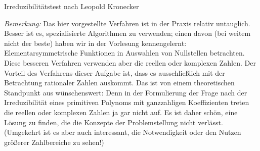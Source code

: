 \documentclass{algblatt}
\begin{document}
\begin{aufgabe}{Irreduzibilitätstest nach Leopold Kronecker}
\begin{loesungE}
\emph{Bemerkung:} Das hier vorgestellte Verfahren ist in der Praxis relativ
untauglich. Besser ist es, spezialisierte Algorithmen zu verwenden; einen davon
(bei weitem nicht der beste) haben wir in der Vorlesung kennengelernt:
Elementarsymmetrische Funktionen in Auswahlen von Nullstellen betrachten.
Diese besseren Verfahren verwenden
aber die reellen oder komplexen Zahlen. Der Vorteil des Verfahrens dieser
Aufgabe ist, dass es ausschließlich mit der Betrachtung rationaler Zahlen
auskommt. Das ist von einem theoretischen Standpunkt aus wünschenswert: Denn in
der Formulierung der Frage nach der Irreduzibilität eines primitiven Polynoms
mit ganzzahligen Koeffizienten treten die reellen oder komplexen Zahlen ja gar
nicht auf. Es ist daher schön, eine Lösung zu finden, die die Konzepte der
Problemstellung nicht verlässt. (Umgekehrt ist es aber auch interessant, die
Notwendigkeit oder den Nutzen größerer Zahlbereiche zu sehen!)
\end{loesungE}
\end{aufgabe}

\end{document}
